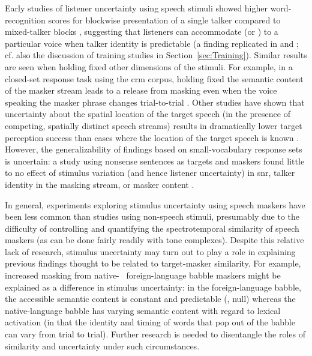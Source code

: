 Early studies of listener uncertainty using speech stimuli showed higher word-recognition scores for blockwise presentation of a single talker compared to mixed-talker blocks \citep{SommersEtAl1994}, suggesting that listeners can accommodate (or ) to a particular voice when talker identity is predictable (a finding replicated in \citealt{BrungartSimpson2004} and \citealt{EricsonEtAl2004}; cf. also the discussion of training studies in Section~\ref{sec:Training}).  Similar results are seen when holding fixed other dimensions of the stimuli.  For example, in a closed-set response task using the \ac{crm} corpus, holding fixed the semantic content of the masker stream leads to a release from masking even when the voice speaking the masker phrase changes trial-to-trial \citep{BrungartSimpson2004}.  Other studies have shown that uncertainty about the spatial location of the target speech (in the presence of competing, spatially distinct speech streams) results in dramatically lower target perception success than cases where the location of the target speech is known \citep{EricsonEtAl2004, KiddEtAl2005a}.  However, the generalizability of findings based on small-vocabulary response sets is uncertain: a study using nonsense sentences as targets and maskers found little to no effect of stimulus variation (and hence listener uncertainty) in \ac{snr}, talker identity in the masking stream, or masker content \citep{FreymanEtAl2007}.

In general, experiments exploring stimulus uncertainty using speech maskers have been less common than studies using non-speech stimuli, presumably due to the difficulty of controlling and quantifying the spectrotemporal similarity of speech maskers (as can be done fairly readily with tone complexes).  Despite this relative lack of research, stimulus uncertainty may turn out to play a role in explaining previous findings thought to be related to target-masker similarity.  For example, increased masking from native- \vs\ foreign-language babble maskers \citep[\eg][]{RhebergenEtAl2005, GarciaLecumberriCooke2006, VanEngenBradlow2007, BrouwerEtAl2012} might be explained as a difference in stimulus uncertainty: in the foreign-language babble, the accessible semantic content is constant and predictable (\ie, null) whereas the native-language babble has varying semantic content with regard to lexical activation (in that the identity and timing of words that pop out of the babble can vary from trial to trial).  Further research is needed to disentangle the roles of similarity and uncertainty under such circumstances.  %

